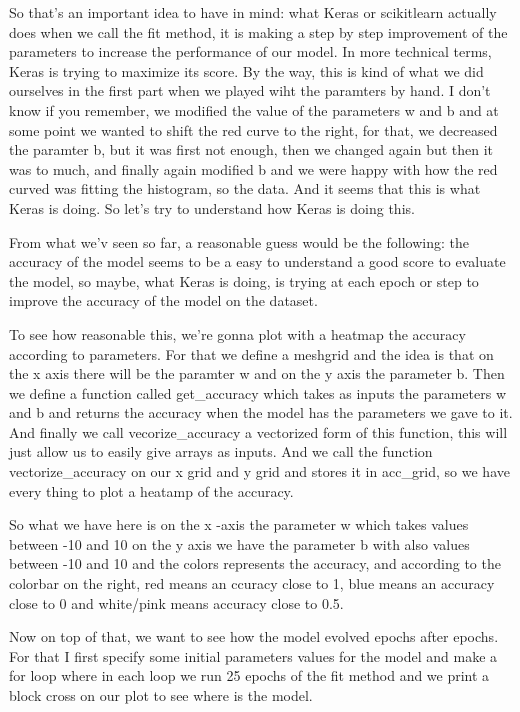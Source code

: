 \documentclass{article}
\begin{document}
So that's an important idea to have in mind: what Keras or scikitlearn 
actually does when we call the fit method, it is making a 
step by step improvement of the parameters to increase the performance 
of our model.
In more technical terms, Keras is trying to maximize its score.
By the way, this is kind of what we did ourselves in the first part 
when we played wiht the paramters by hand. 
I don't know if you remember, we modified the value of the parameters w and b 
and at some point we wanted to shift the red curve to the right, 
for that, we decreased the paramter b, but it was first not enough, then 
we changed again but then it was to much, and finally again 
modified b and we were happy with how the red curved was fitting the histogram, 
so the data.
And it seems that this is what Keras is doing.
So let's try to understand how Keras is doing this.

From what we'v seen so far, a reasonable guess would be the following:
the accuracy of the model seems to be a easy to understand a good score to 
evaluate the model, so maybe, what Keras is doing, is trying at each epoch or step 
to improve the accuracy of the model on the dataset.

To see how reasonable this, we're gonna plot with a heatmap the accuracy according 
to parameters. 
For that we define a meshgrid and 
the idea is that on the x axis there will be the paramter w and 
on the y axis the parameter b.
Then we define a function called get\_accuracy which takes as inputs the parameters w and b 
and returns the accuracy when the model has the parameters we gave to it.
And finally we call vecorize\_accuracy a vectorized form of this function, 
this will just allow us to easily give arrays as inputs.
And we call the function vectorize\_accuracy on our x grid and y grid and stores it in 
acc\_grid, so we have every thing to plot a heatamp of the accuracy.

So what we have here is on the x -axis the parameter w which takes values between -10 and 10
on the y axis we have the parameter b with also values between -10 and 10 and 
the colors represents the accuracy, and according to the colorbar on the right, 
red means an ccuracy close to 1, blue means an accuracy close to 0 and white/pink means 
accuracy close to 0.5.

Now on top of that, we want to see how the model evolved epochs after epochs. 
For that I first specify some initial parameters values for the model and 
make a for loop where in each loop we run 25 epochs of the fit method and we print a 
block cross on our plot to see where is the model.
\end{document}
